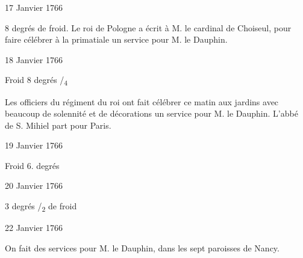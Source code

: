                      \begin{diary}{17 Janvier 1766}{}
                        
                        
                           8 degrés de froid. Le
                              roi de Pologne a écrit à
                           M. le cardinal de Choiseul, pour faire célébrer
                           à la primatiale un
                           service pour M. le Dauphin.
                        \bigskip
        
        
                     \end{diary}
                     
                     \begin{diary}{18 Janvier 1766}{}
                        
                        
                           Froid 8 degrés
                              /\textsubscript{4}
                        \bigskip
        
        
                         Les officiers du régiment du roi ont fait célébrer
                           ce matin aux jardins avec beaucoup de
                           solennité et de décorations un service pour
                           M. le Dauphin. L'abbé de S. Mihiel part pour
                              Paris. \bigskip
        
        
                     \end{diary}

                     \begin{diary}{19 Janvier 1766}{}
                        
                        
                           Froid 6. degrés
                        \bigskip
        
        
                     \end{diary}

                     \begin{diary}{20 Janvier 1766}{}
                        
                        
                           3 degrés
                              /\textsubscript{2} de froid
                        \bigskip
        
        
                     \end{diary}

                     \begin{diary}{22 Janvier 1766}{}
                        
                         On fait des services pour M. le Dauphin,
                           dans les sept paroisses de Nancy. \bigskip
        
        
                     \end{diary}

